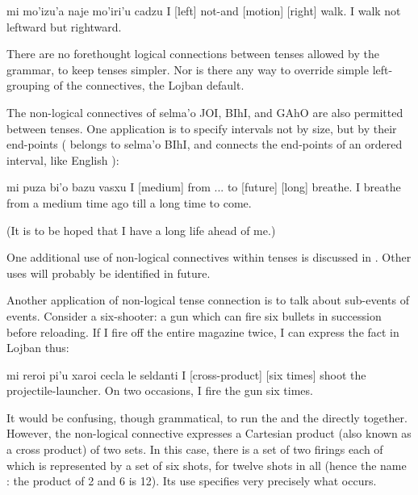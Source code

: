 \begin{example}
mi mo'izu'a naje mo'iri'u cadzu\n
I  [left] not-and [motion] [right] walk.\n
I walk not leftward but rightward.
\end{example}

There are no forethought logical connections between tenses
    allowed by the grammar, to keep tenses simpler. Nor is there
    any way to override simple left-grouping of the connectives,
    the Lojban default. 

The non-logical connectives of selma'o JOI, BIhI, and GAhO
    are also permitted between tenses. One application is to
    specify intervals not by size, but by their end-points
    ( belongs to selma'o BIhI, and connects the end-points
    of an ordered interval, like English ):
\begin{example}
mi puza bi'o bazu vasxu\n
I  [medium] from ... to [future] [long] breathe.\n
I breathe from a medium time ago till a long time\n
\T	to come.
\end{example}

(It is to be hoped that I have a long life ahead of me.) 

One additional use of non-logical connectives within tenses
    is discussed in . Other uses will
    probably be identified in future.



Another application of non-logical tense connection is to
    talk about sub-events of events. Consider a six-shooter: a gun
    which can fire six bullets in succession before reloading. If I
    fire off the entire magazine twice, I can express the fact in
    Lojban thus:
\begin{example}
mi reroi pi'u xaroi\n
\T	cecla le seldanti\n
I  [cross-product] [six times]\n
\T	shoot the projectile-launcher.\n
On two occasions, I fire the gun six times.
\end{example}

It would be confusing, though grammatical, to run the 
    and the  directly together. However, the non-logical
    connective  expresses a Cartesian product (also known
    as a cross product) of two sets. In this case, there is a set
    of two firings each of which is represented by a set of six
    shots, for twelve shots in all (hence the name : the
    product of 2 and 6 is 12). Its use specifies very precisely
    what occurs. 

